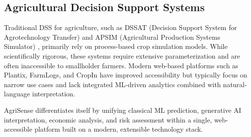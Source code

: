 \subsection{Agricultural Decision Support Systems}
Traditional DSS for agriculture, such as DSSAT (Decision Support System for Agrotechnology Transfer) \cite{jones2003} and APSIM (Agricultural Production Systems Simulator) \cite{holzworth2014}, primarily rely on process-based crop simulation models. While scientifically rigorous, these systems require extensive parameterization and are often inaccessible to smallholder farmers. Modern web-based platforms such as Plantix, FarmLogs, and CropIn have improved accessibility but typically focus on narrow use cases and lack integrated ML-driven analytics combined with natural-language interpretation.

AgriSense differentiates itself by unifying classical ML prediction, generative AI interpretation, economic analysis, and risk assessment within a single, web-accessible platform built on a modern, extensible technology stack.
